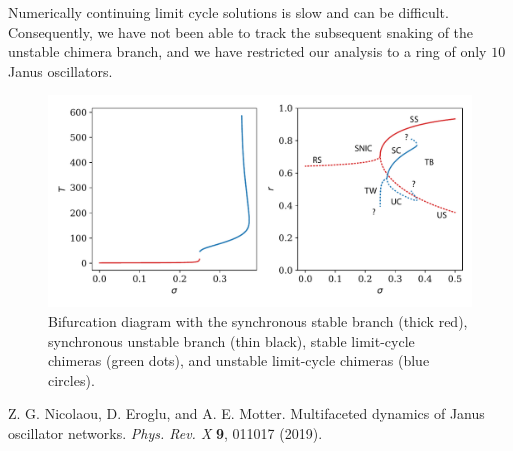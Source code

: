 \documentclass[aps,pre,amsmath,amssymb,floatfix,onecolumn,notitlepage,10pt]{revtex4-1}
\begin{document}
Numerically continuing limit cycle solutions is slow and can be difficult.  Consequently, we have not been able to track the subsequent snaking of the unstable chimera branch, and we have restricted our analysis to a ring of only $10$ Janus oscillators.
\begin{figure}[hb]
\includegraphics[width=\columnwidth]{diagram.pdf}
\caption{Bifurcation diagram with the synchronous stable branch (thick red), synchronous unstable branch (thin black), stable limit-cycle chimeras (green dots), and unstable limit-cycle chimeras (blue circles). \label{fig1}}
\end{figure}
\begin{thebibliography}{99}
 Z. G. Nicolaou, D. Eroglu, and A. E. Motter. Multifaceted dynamics of Janus oscillator networks. \textit{Phys. Rev. X} \textbf{9}, 011017 (2019).
\end{thebibliography}
\end{document}
